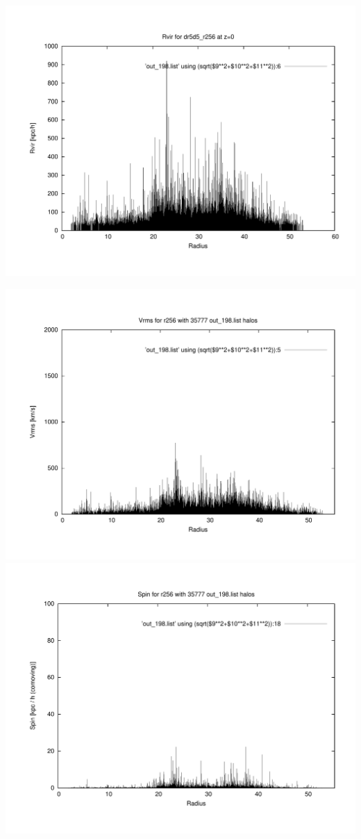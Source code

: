 \includegraphics[scale=0.3]{r256/dr5d5_r256/plot_rvir_z0.pdf}

\includegraphics[scale=0.3]{r256/dr5d5_r256/plot_Vrms_out_198.pdf}
\includegraphics[scale=0.3]{r256/dr5d5_r256/plot_spin_out_198.pdf}

